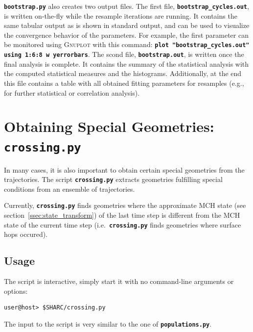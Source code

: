 \documentclass[a4paper,10pt,DIV=15,openany]{scrbook}
\newcommand{\ttt}[1]{\textbf{\texttt{#1}}}
\begin{document}
\ttt{bootstrap.py} also creates two output files.
The first file, \ttt{bootstrap\_cycles.out}, is written on-the-fly while the resample iterations are running.
It contains the same tabular output as is shown in standard output, and can be used to visualize the convergence behavior of the parameters. For example, the first parameter can be monitored using \textsc{Gnuplot} with this command: \ttt{plot "bootstrap\_cycles.out" using 1:6:8 w yerrorbars}.
The scond file, \ttt{bootstrap.out}, is written once the final analysis is complete. It contains the summary of the statistical analysis with the computed statistical measures and the histograms.
Additionally, at the end this file contains a table with all obtained fitting parameters for resamples (e.g., for further statistical or correlation analysis).











\section{Obtaining Special Geometries: \ttt{crossing.py}}\label{sec:crossing.py}

In many cases, it is also important to obtain certain special geometries from the trajectories. The script \ttt{crossing.py} extracts geometries fulfilling special conditions from an ensemble of trajectories. 

Currently, \ttt{crossing.py} finds geometries where the approximate MCH state (see section~\ref{ssec:state_transform}) of the last time step is different from the MCH state of the current time step (i.e.\ \ttt{crossing.py} finds geometries where surface hops occured). 

\subsection{Usage}

The script is interactive, simply start it with no command-line arguments or options:
\begin{verbatim}
user@host> $SHARC/crossing.py
\end{verbatim}

The input to the script is very similar to the one of \ttt{populations.py}. 
\end{document}
